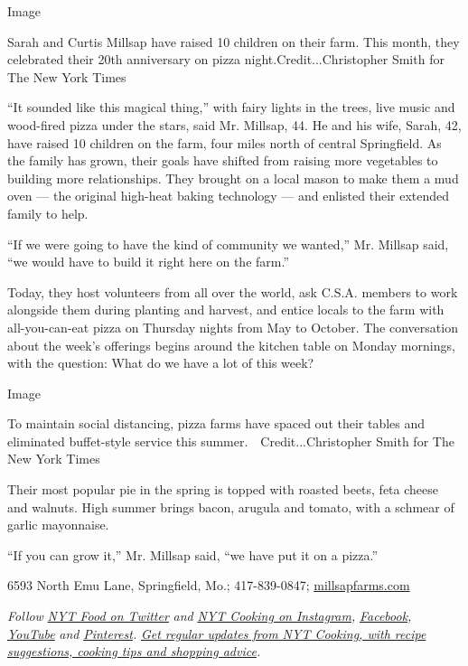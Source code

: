 Image

Sarah and Curtis Millsap have raised 10 children on their farm. This
month, they celebrated their 20th anniversary on pizza
night.Credit...Christopher Smith for The New York Times

``It sounded like this magical thing,'' with fairy lights in the trees,
live music and wood-fired pizza under the stars, said Mr. Millsap, 44.
He and his wife, Sarah, 42, have raised 10 children on the farm, four
miles north of central Springfield. As the family has grown, their goals
have shifted from raising more vegetables to building more
relationships. They brought on a local mason to make them a mud oven ---
the original high-heat baking technology --- and enlisted their extended
family to help.

``If we were going to have the kind of community we wanted,'' Mr.
Millsap said, ``we would have to build it right here on the farm.''

Today, they host volunteers from all over the world, ask C.S.A. members
to work alongside them during planting and harvest, and entice locals to
the farm with all-you-can-eat pizza on Thursday nights from May to
October. The conversation about the week's offerings begins around the
kitchen table on Monday mornings, with the question: What do we have a
lot of this week?

Image

To maintain social distancing, pizza farms have spaced out their tables
and eliminated buffet-style service this summer.~~Credit...Christopher
Smith for The New York Times

Their most popular pie in the spring is topped with roasted beets, feta
cheese and walnuts. High summer brings bacon, arugula and tomato, with a
schmear of garlic mayonnaise.

``If you can grow it,'' Mr. Millsap said, ``we have put it on a pizza.''

6593 North Emu Lane, Springfield, Mo.; 417-839-0847;
\href{https://www.millsapfarms.com/}{millsapfarms.com}

\emph{Follow} \href{https://twitter.com/nytfood}{\emph{NYT Food on
Twitter}} \emph{and}
\href{https://www.instagram.com/nytcooking/}{\emph{NYT Cooking on
Instagram}}\emph{,}
\href{https://www.facebookcorewwwi.onion/nytcooking/}{\emph{Facebook}}\emph{,}
\href{https://www.youtube.com/nytcooking}{\emph{YouTube}} \emph{and}
\href{https://www.pinterest.com/nytcooking/}{\emph{Pinterest}}\emph{.}
\href{https://www.nytimes3xbfgragh.onion/newsletters/cooking}{\emph{Get
regular updates from NYT Cooking, with recipe suggestions, cooking tips
and shopping advice}}\emph{.}

